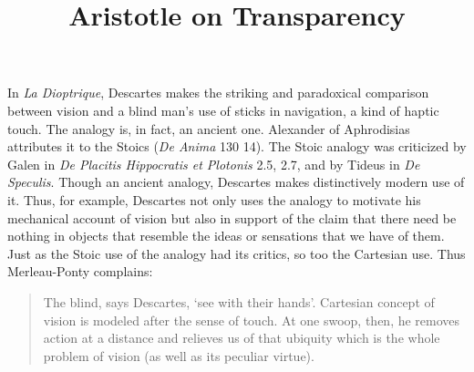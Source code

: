 \documentclass[12pt]{article}
\title{Aristotle on Transparency}
\author{\myauthor}
\date{} %
\begin{document}
\maketitle

\setlength{\parindent}{1em}


In \emph{La Dioptrique}, Descartes makes the striking and paradoxical comparison between vision and a blind man's use of sticks in navigation, a kind of haptic touch. The analogy is, in fact, an ancient one. Alexander of Aphrodisias attributes it to the Stoics (\emph{De Anima} 130 14). The Stoic analogy was criticized by Galen in \emph{De Placitis Hippocratis et Plotonis} 2.5, 2.7, and by Tideus in \emph{De Speculis}. Though an ancient analogy, Descartes makes distinctively modern use of it. Thus, for example, Descartes not only uses the analogy to motivate his mechanical account of vision but also in support of the claim that there need be nothing in objects that resemble the ideas or sensations that we have of them. Just as the Stoic use of the analogy had its critics, so too the Cartesian use. Thus Merleau-Ponty complains:
\begin{quote}
	The blind, says Descartes, ‘see with their hands’. Cartesian concept of vision is modeled after the sense of touch. At one swoop, then, he removes action at a distance and relieves us of that ubiquity which is the whole problem of vision (as well as its peculiar virtue). \citep[170]{Merleau-Ponty:1964aa}
\end{quote}

 
 
\end{document}
